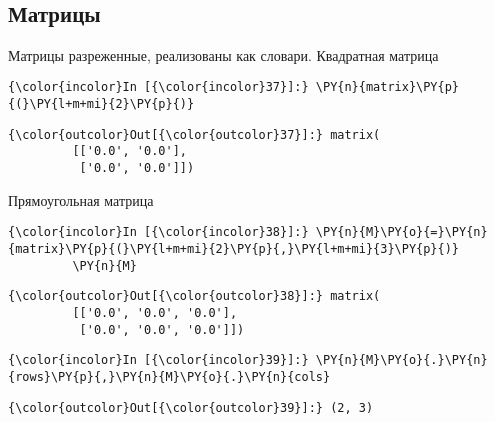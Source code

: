     \begin{center}
    \end{center}
    { \hspace*{\fill} \\}
    
\subsection{Матрицы}
\label{mpmath8}

Матрицы разреженные, реализованы как словари. Квадратная матрица

    \begin{Verbatim}[commandchars=\\\{\}]
{\color{incolor}In [{\color{incolor}37}]:} \PY{n}{matrix}\PY{p}{(}\PY{l+m+mi}{2}\PY{p}{)}
\end{Verbatim}

            \begin{Verbatim}[commandchars=\\\{\}]
{\color{outcolor}Out[{\color{outcolor}37}]:} matrix(
         [['0.0', '0.0'],
          ['0.0', '0.0']])
\end{Verbatim}
        
    Прямоугольная матрица

    \begin{Verbatim}[commandchars=\\\{\}]
{\color{incolor}In [{\color{incolor}38}]:} \PY{n}{M}\PY{o}{=}\PY{n}{matrix}\PY{p}{(}\PY{l+m+mi}{2}\PY{p}{,}\PY{l+m+mi}{3}\PY{p}{)}
         \PY{n}{M}
\end{Verbatim}

            \begin{Verbatim}[commandchars=\\\{\}]
{\color{outcolor}Out[{\color{outcolor}38}]:} matrix(
         [['0.0', '0.0', '0.0'],
          ['0.0', '0.0', '0.0']])
\end{Verbatim}
        
    \begin{Verbatim}[commandchars=\\\{\}]
{\color{incolor}In [{\color{incolor}39}]:} \PY{n}{M}\PY{o}{.}\PY{n}{rows}\PY{p}{,}\PY{n}{M}\PY{o}{.}\PY{n}{cols}
\end{Verbatim}

            \begin{Verbatim}[commandchars=\\\{\}]
{\color{outcolor}Out[{\color{outcolor}39}]:} (2, 3)
\end{Verbatim}
        
